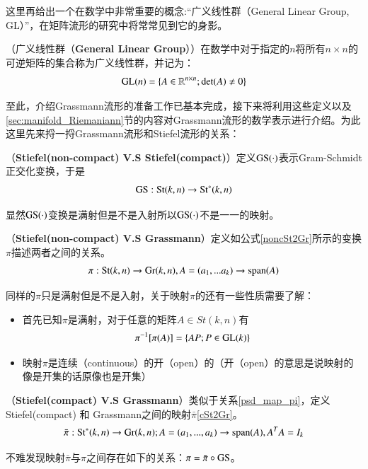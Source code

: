 这里再给出一个在数学中非常重要的概念:“广义线性群（General Linear Group, GL）”，在矩阵流形的研究中将常常见到它的身影。
\begin{definition}
\label{General_Linear_Group}
{\heiti （广义线性群（\textbf{General Linear Group}））}在数学中对于指定的$n$将所有$n\times n$的可逆矩阵的集合称为广义线性群，并记为：
\begin{equation}
{\rm GL}(n)=\{A \in \mathbb{R}^{n\times n};{\rm{det}}(A)\neq 0\}
\end{equation}
\end{definition}

至此，介绍Grassmann流形的准备工作已基本完成，接下来将利用这些定义以及\ref{sec:manifold_Riemaniann}节的内容对Grassmann流形的数学表示进行介绍。为此这里先来捋一捋Grassmann流形和Stiefel流形的关系：
\begin{rela}
\label{Relation_SS}
{\heiti （\textbf{Stiefel(non-compact) V.S Stiefel(compact)}）}定义${\rm GS}(\cdot)$表示Gram-Schmidt正交化变换，于是\begin{equation}
{\rm GS}:{\rm St}(k,n) \rightarrow {\rm St}^{*}(k,n)
\end{equation}
\end{rela}
显然${\rm GS}(\cdot)$变换是满射但是不是入射所以${\rm GS}(\cdot)$不是一一的映射。
\begin{rela}
\label{psd_map_pi}
{\heiti （\textbf{Stiefel(non-compact) V.S Grassmann}）}定义如公式\ref{noncSt2Gr}所示的变换$\pi$描述两者之间的关系。
\begin{equation}
\label{noncSt2Gr}
\pi:{\rm St}(k,n) \rightarrow {\rm Gr}(k,n),A=(a_1,...a_k)\rightarrow {\rm{span}}(A)
\end{equation}
\end{rela}
同样的$\pi$只是满射但是不是入射，关于映射$\pi$的还有一些性质需要了解：
\begin{itemize}
\item 首先已知$\pi$是满射，对于任意的矩阵$A \in St(k,n)$有
\begin{equation}
\pi^{-1}[\pi(A)]=\{AP;P\in {\rm GL}(k)\}
\end{equation}
\item 映射$\pi$是连续（continuous）的开（open）的（开（open）的意思是说映射的像是开集的话原像也是开集）
\end{itemize}
\begin{rela}
{\heiti （\textbf{Stiefel(compact) V.S Grassmann}）}类似于关系\ref{psd_map_pi}，定义Stiefel(compact) 和 Grassmann之间的映射$\bar{\pi}$\ref{cSt2Gr}。
\begin{equation}
\label{cSt2Gr}
\bar{\pi}:{\rm St}^{*}(k,n)\rightarrow {\rm Gr}(k,n);A=(a_1,...,a_k)\rightarrow {\rm{span}}(A),A^{T}A=I_k 
\end{equation}
\end{rela}
不难发现映射$\bar{\pi}$与$\pi$之间存在如下的关系：$\pi=\bar{\pi}\circ {\rm GS}$。

